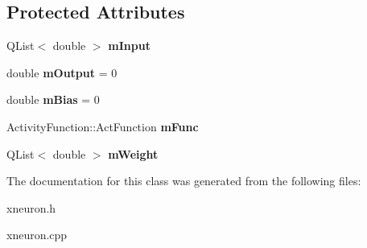 \subsection*{Protected Attributes}
\begin{DoxyCompactItemize}
\item 
\hypertarget{class_x_neuron_ac69d818c1d38c321a232fd9557635300}{}\label{class_x_neuron_ac69d818c1d38c321a232fd9557635300} 
Q\+List$<$ double $>$ {\bfseries m\+Input}
\item 
\hypertarget{class_x_neuron_abaffc1446ad83470d54c87de5a6a117a}{}\label{class_x_neuron_abaffc1446ad83470d54c87de5a6a117a} 
double {\bfseries m\+Output} = 0
\item 
\hypertarget{class_x_neuron_af4b92137a421c14961971e24ced0f458}{}\label{class_x_neuron_af4b92137a421c14961971e24ced0f458} 
double {\bfseries m\+Bias} = 0
\item 
\hypertarget{class_x_neuron_a7b9457385c80f6ec33dd301b7f071700}{}\label{class_x_neuron_a7b9457385c80f6ec33dd301b7f071700} 
Activity\+Function\+::\+Act\+Function {\bfseries m\+Func}
\item 
\hypertarget{class_x_neuron_a62fecf6b44a6c56f983e20591fa62404}{}\label{class_x_neuron_a62fecf6b44a6c56f983e20591fa62404} 
Q\+List$<$ double $>$ {\bfseries m\+Weight}
\end{DoxyCompactItemize}


The documentation for this class was generated from the following files\+:\begin{DoxyCompactItemize}
\item 
xneuron.\+h\item 
xneuron.\+cpp\end{DoxyCompactItemize}
